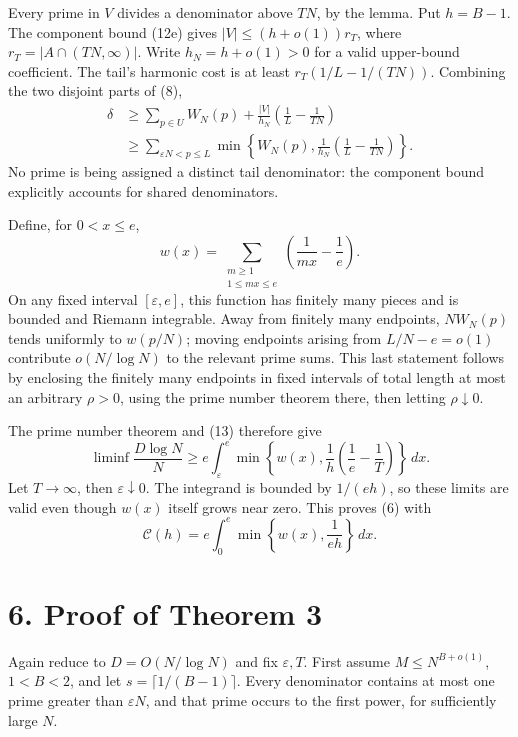 \documentclass[11pt]{article}
\begin{document}
Every prime in \(V\) divides a denominator above \(TN\), by the lemma. Put \(h=B-1\). The component bound (12e) gives \(|V|\le(h+o(1))r_T\), where \(r_T=|A\cap(TN,\infty)|\). Write \(h_N=h+o(1)>0\) for a valid upper-bound coefficient. The tail's harmonic cost is at least \(r_T(1/L-1/(TN))\). Combining the two disjoint parts of (8),
\[
\begin{aligned}
\delta
&\ge\sum_{p\in U}W_N(p)
       +\frac{|V|}{h_N}\left(\frac1L-\frac1{TN}\right)\\
&\ge\sum_{\varepsilon N<p\le L}
 \min\left\{W_N(p),\frac1{h_N}\left(\frac1L-\frac1{TN}\right)\right\}.
\end{aligned} \tag{13}
\]
No prime is being assigned a distinct tail denominator: the component bound explicitly accounts for shared denominators.

Define, for \(0<x\le e\),
\[
w(x)=\sum_{\substack{m\ge1\\1\le mx\le e}}
                  \left(\frac1{mx}-\frac1e\right). \tag{14}
\]
On any fixed interval \([\varepsilon,e]\), this function has finitely many pieces and is bounded and Riemann integrable. Away from finitely many endpoints, \(NW_N(p)\) tends uniformly to \(w(p/N)\); moving endpoints arising from \(L/N-e=o(1)\) contribute \(o(N/\log N)\) to the relevant prime sums. This last statement follows by enclosing the finitely many endpoints in fixed intervals of total length at most an arbitrary \(\rho>0\), using the prime number theorem there, then letting \(\rho\downarrow0\).

The prime number theorem and (13) therefore give
\[
\liminf\frac{D\log N}{N}
\ge e\int_\varepsilon^e
 \min\left\{w(x),\frac1h\left(\frac1e-\frac1T\right)\right\}\,dx.
\]
Let \(T\to\infty\), then \(\varepsilon\downarrow0\). The integrand is bounded by \(1/(eh)\), so these limits are valid even though \(w(x)\) itself grows near zero. This proves (6) with
\[
\mathcal C(h)=e\int_0^e\min\left\{w(x),\frac1{eh}\right\}\,dx. \tag{15}
\]

\section*{6. Proof of Theorem 3}

Again reduce to \(D=O(N/\log N)\) and fix \(\varepsilon,T\). First assume \(M\le N^{B+o(1)}\), \(1<B<2\), and let \(s=\lceil1/(B-1)\rceil\). Every denominator contains at most one prime greater than \(\varepsilon N\), and that prime occurs to the first power, for sufficiently large \(N\).
\end{document}
